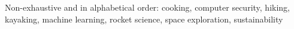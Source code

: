 \documentclass[10pt,a4paper]{article} %
\begin{document}
\spacedhrule{1.6em}{-0.4em} %



\inlineheadsection %
{Non-exhaustive and in alphabetical order:}
{cooking, computer security, hiking, kayaking, machine learning,  rocket science, space exploration, sustainability}
\end{document}
